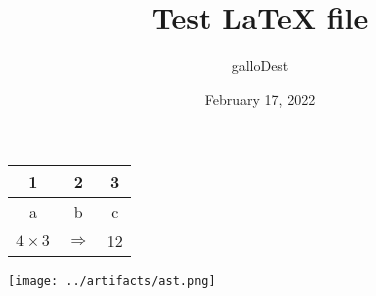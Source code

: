 \documentclass[12pt]{article}
\title{Test LaTeX file}
\author{galloDest}
\date{February 17, 2022}
\begin{document}
\maketitle

\begin{center}
	\begin{tabular} { c | c | c }
	1 & 2 & 3 \\
	\hline
	a & b & c \\
	\hline
	$4\times 3$ & $\Rightarrow $ & 12
	\end{tabular}
\end{center}

\begin{center}
	\texttt{[image: ../artifacts/ast.png]}\\
\end{center}
\end{document}
